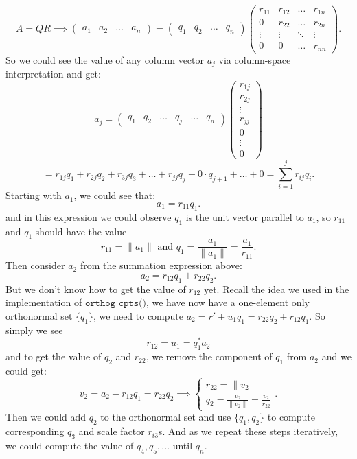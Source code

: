  \[
   A = QR \implies \begin{pmatrix} a_1 & a_2 & \ldots & a_n \end{pmatrix} = 
   \begin{pmatrix} 
     q_1 & q_2 & \ldots & q_n 
  \end{pmatrix} 
   \begin{pmatrix} 
     r_{11} & r_{12} & \ldots & r_{1n} \\ 
     0 & r_{22} & \ldots & r_{2n} \\
     \vdots & \vdots & \ddots & \vdots \\
     0 & 0 & \ldots & r_{nn}
   \end{pmatrix}  
.\] 
So we could see the value of any column vector $a_j$ via column-space interpretation and get:
\[
  a_j = 
   \begin{pmatrix} 
     q_1 & q_2 & \ldots & q_j & \ldots & q_n 
  \end{pmatrix} 
  \begin{pmatrix} r_{1j}\\ r_{2j} \\ \vdots\\ r_{jj} \\ 0 \\ \vdots \\ 0 \end{pmatrix}
\] 
\[
  = r_{1j} q_1 + r_{2j}q_2 + r_{3j}q_3 + \ldots + r_{jj}q_j + 0 \cdot q_{j + 1} + \ldots + 0
  = \sum_{i=1}^{j} r_{ij}q_i
.\] 
Starting with $a_1$, we could see that:
 \[
a_1 = r_{11} q_1
.\] 
and in this expression we could observe $q_1$ is the unit vector parallel to $a_1$, so $r_{11}$ and $q_1$ should have the value
\[
r_{11} = \|a_1\| \text{ and } q_1 = \frac{a_1}{\|a_1\|} = \frac{a_1}{r_{11}}
.\]
Then consider $a_2$ from the summation expression above:
 \[
a_2 = r_{12}q_1 + r_{22}q_2
.\]
But we don't know how to get the value of $r_{12}$ yet. Recall the idea we used in the implementation of $\texttt{orthog\_cpts()}$, we have now have a one-element only orthonormal set $ \{q_1\} $, we need to compute $a_2 = r' + u_1q_1 = r_{22}q_2 + r_{12}q_1$. So simply we see
\[
  r_{12} = u_1 = q_1^* a_2
\]
and to get the value of $q_2$ and $r_{22}$, we remove the component of $q_1$ from $a_2$ and we could get:
\[
    v_2 = a_2 - r_{12}q_1 = r_{22}q_2 \implies 
    \left\{
      \begin{array}{l}
      r_{22} = \|v_2\| \\
      q_2 = \frac{v_2}{\|v_2\|} = \frac{v_2}{r_{22}}
      \end{array}
    \right.
.\]
Then we could add $q_2$ to the orthonormal set and use $ \{q_1, q_2\} $ to compute corresponding $q_3$ and scale factor $r_{i3}$s. And as we repeat these steps iteratively, we could compute the value of $q_4, q_5, \ldots$ until $q_n$. \medskip

